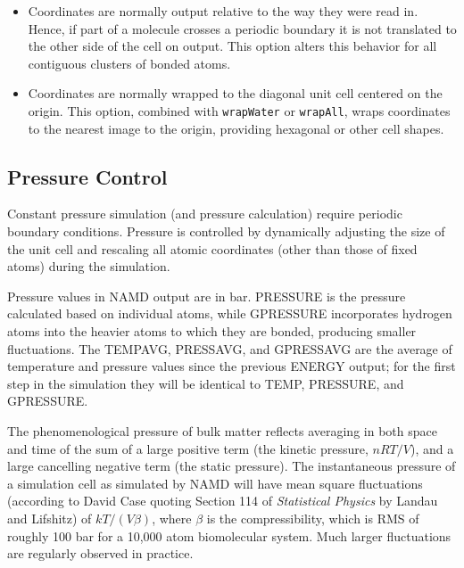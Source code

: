 \begin{itemize}
\item
{}
{Coordinates are normally output relative to the way they were read in.  Hence, if part of a molecule crosses a periodic boundary it is not translated to the other side of the cell on output.  This option alters this behavior for all contiguous clusters of bonded atoms.}

\item
{}
{Coordinates are normally wrapped to the diagonal unit cell centered on the origin.  This option, combined with {\tt wrapWater} or {\tt wrapAll}, wraps coordinates to the nearest image to the origin, providing hexagonal or other cell shapes.}

\end{itemize}

\subsection{Pressure Control}

Constant pressure simulation (and pressure calculation) require periodic
boundary conditions.  Pressure is controlled by dynamically adjusting
the size of the unit cell and rescaling all atomic coordinates (other than
those of fixed atoms) during the simulation.

Pressure values in NAMD output are in bar.
PRESSURE is the pressure calculated based on individual atoms, while
GPRESSURE incorporates hydrogen atoms into the heavier atoms to which
they are bonded, producing smaller fluctuations.
The TEMPAVG, PRESSAVG, and GPRESSAVG are the average of temperature and
pressure values since the previous ENERGY output; for the first step
in the simulation they will be identical to TEMP, PRESSURE, and GPRESSURE.

The phenomenological pressure of bulk matter reflects averaging in both
space and time of the sum of a large positive term (the kinetic pressure,
$nRT/V$), and a large cancelling negative term (the static pressure).
The instantaneous pressure of a simulation cell as simulated by NAMD
will have mean square fluctuations (according to David Case quoting
Section 114 of {\em Statistical Physics} by Landau and Lifshitz)
of $kT/(V \beta)$, where $\beta$ is the compressibility, which is
RMS of roughly 100 bar for a 10,000 atom biomolecular system.
Much larger fluctuations are regularly observed in practice.

